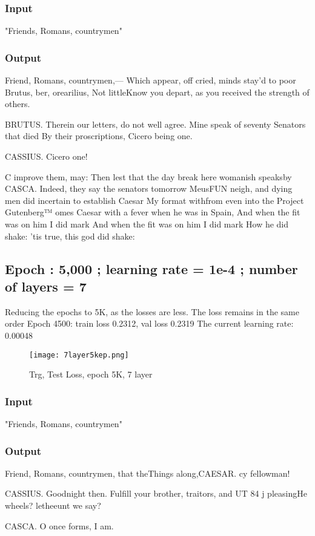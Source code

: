 \documentclass[conference]{IEEEtran}
\begin{document}
\subsubsection{Input}
"Friends, Romans, countrymen"
\subsubsection{Output}
Friend, Romans, countrymen,—
Which appear, off cried, minds stay’d to poor Brutus,
ber, orearilius,
Not littleKnow you depart, as you received the strength of others.

BRUTUS.
Therein our letters, do not well agree.
Mine speak of seventy Senators that died
By their proscriptions, Cicero being one.

CASSIUS.
Cicero one!

C improve them, may:
Then lest that the day break here womanish speaksby
CASCA.
Indeed, they say the senators tomorrow
MeusFUN neigh, and dying men did incertain to establish Caesar
My format withfrom even into the Project Gutenberg™
omes Caesar with a fever when he was in Spain,
And when the fit was on him I did mark
And when the fit was on him I did mark
How he did shake: ’tis true, this god did shake:

\subsection{Epoch : 5,000 ; learning rate = 1e-4 ; number of layers = 7}
Reducing the epochs to 5K, as the losses are less. The loss remains in the same order
Epoch 4500: train loss 0.2312, val loss 0.2319
The current learning rate: 0.00048
\begin{figure}[H]
    \centering
    \texttt{[image: 7layer5kep.png]}
    \caption{Trg, Test Loss, epoch 5K, 7 layer}
    \label{fig:epoch}
\end{figure}
\subsubsection{Input}
"Friends, Romans, countrymen"
\subsubsection{Output}
Friend, Romans, countrymen, that theThings along,CAESAR.
cy fellowman!

CASSIUS.
Goodnight then.
Fulfill your brother, traitors, and UT 84 j pleasingHe wheels?
 letheeunt we say?

CASCA.
O once forms, I am.
\end{document}
